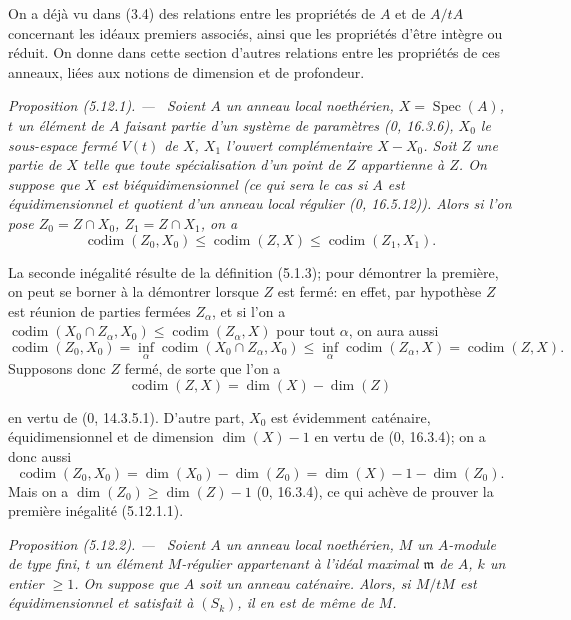 \documentclass[10pt,oneside]{book}
\newcommand{\oldpage}[2][]{%
  \setcounter{footnote}{0}%
  \marginpar{\scriptsize\textbf{#1}~|~#2}\ignorespaces}
\newenvironment{proposition}[1][]{%
  \par\medskip\noindent\itshape Proposition (#1). ---\ }{\par}
\begin{document}
On a déjà vu dans (3.4) des relations entre les propriétés de $A$ et de $A/tA$
concernant les idéaux premiers associés, ainsi que les propriétés d'être
intègre ou réduit. On donne dans cette section d'autres relations entre les
propriétés de ces anneaux, liées aux notions de dimension et de profondeur.

\begin{proposition}[5.12.1]
\label{IV.2.s5.12.1-fr}
Soient $A$ un anneau local noethérien, $X=\operatorname{Spec}(A)$, $t$ un
élément de $A$ faisant partie d'un système de paramètres (0, 16.3.6), $X_0$ le
sous-espace fermé $V(t)$ de $X$, $X_1$ l'ouvert complémentaire $X-X_0$. Soit
$Z$ une partie de $X$ telle que toute spécialisation d'un point de $Z$
appartienne à $Z$. On suppose que $X$ est biéquidimensionnel (ce qui sera le
cas si $A$ est équidimensionnel et quotient d'un anneau local régulier (0,
16.5.12)). Alors si l'on pose $Z_0=Z\cap X_0$, $Z_1=Z\cap X_1$, on a
\begin{equation}
\operatorname{codim}(Z_0,X_0)\leq\operatorname{codim}(Z,X)
\leq\operatorname{codim}(Z_1,X_1).
\tag{5.12.1.1}\label{IV.2.s5.12.1.1-fr}
\end{equation}
\end{proposition}

La seconde inégalité résulte de la définition (5.1.3); pour démontrer la
première, on peut se borner à la démontrer lorsque $Z$ est fermé: en effet, par
hypothèse $Z$ est réunion de parties fermées $Z_\alpha$, et si l'on a
$\operatorname{codim}(X_0\cap Z_\alpha,X_0)
\leq\operatorname{codim}(Z_\alpha,X)$ pour tout $\alpha$, on aura aussi
\[
\operatorname{codim}(Z_0,X_0)
=\inf_\alpha\operatorname{codim}(X_0\cap Z_\alpha,X_0)
\leq\inf_\alpha\operatorname{codim}(Z_\alpha,X)
=\operatorname{codim}(Z,X).
\]
Supposons donc $Z$ fermé, de sorte que l'on a
\[
\operatorname{codim}(Z,X)=\dim(X)-\dim(Z)
\]

\oldpage[IV-2]{127}

en vertu de (0, 14.3.5.1). D'autre part, $X_0$ est évidemment caténaire,
équidimensionnel et de dimension $\dim(X)-1$ en vertu de (0, 16.3.4); on a
donc aussi
\[
\operatorname{codim}(Z_0,X_0)=\dim(X_0)-\dim(Z_0)
=\dim(X)-1-\dim(Z_0).
\]
Mais on a $\dim(Z_0)\geq\dim(Z)-1$ (0, 16.3.4), ce qui achève de prouver la
première inégalité (5.12.1.1).

\begin{proposition}[5.12.2]
\label{IV.2.s5.12.2-fr}
Soient $A$ un anneau local noethérien, $M$ un $A$-module de type fini, $t$ un
élément $M$-régulier appartenant à l'idéal maximal $\mathfrak m$ de $A$, $k$
un entier $\geq1$. On suppose que $A$ soit un anneau caténaire. Alors, si
$M/tM$ est équidimensionnel et satisfait à $(S_k)$, il en est de même de $M$.
\end{proposition}
\end{document}
